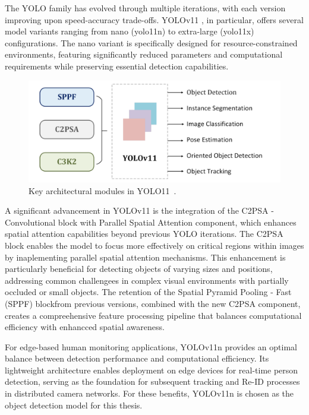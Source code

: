 \documentclass[../main.tex]{subfiles}
\begin{document}
The YOLO family has evolved through multiple iterations, with each version improving upon speed-accuracy trade-offs. YOLOv11 \cite{khanam2024yolov11overviewkeyarchitectural}, in particular, offers several model variants ranging from nano (yolo11n) to extra-large (yolo11x)\\configurations. The nano variant is specifically designed for resource-constrained environments, featuring significantly reduced parameters and computational requirements while preserving essential detection capabilities.

\begin{figure}[h!]
\centering
\includegraphics[width=\linewidth]{Figure/yolov11.png}
\caption{ Key architectural modules in YOLO11~\cite{khanam2024yolov11overviewkeyarchitectural}.}
\label{fig:yolov11}
\end{figure}

A significant advancement in YOLOv11 is the integration of the C2PSA - Convolutional
block with Parallel Spatial Attention component, which enhances spatial attention capabilities beyond previous YOLO iterations. The C2PSA block enables the model to focus more effectively on critical regions within images by inaplementing parallel spatial
attention mechanisms. This enhancement is particularly beneficial for detecting objects of varying sizes and positions, addressing common challengees in complex visual environments with partially occluded or small objects. The retention of the Spatial Pyramid Pooling - Fast (SPPF) blockfrom previous versions, combined with the new C2PSA component, creates a compreehensive feature processing pipeline that balances computational efficiency with enhancced spatial awareness.

For edge-based human monitoring applications, YOLOv11n provides an optimal balance between detection performance and computational efficiency. Its lightweight architecture enables deployment on edge devices for real-time person detection, serving as the foundation for subsequent tracking and Re-ID processes in distributed camera networks. For these benefits, YOLOv11n is chosen as the object detection model for this thesis.
\end{document}
